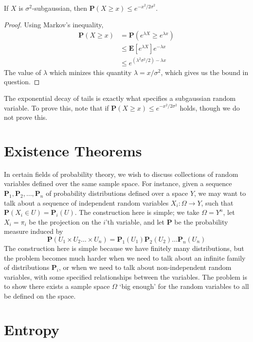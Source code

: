 \begin{theorem}
    If $X$ is $\sigma^2$-subgaussian, then $\mathbf{P}(X \geq x) \leq e^{-x^2/2\sigma^2}$.
\end{theorem}
\begin{proof}
    Using Markov's inequality,
    \begin{align*}
        \mathbf{P}(X \geq x) &= \mathbf{P}(e^{\lambda X} \geq e^{\lambda x})\\
        &\leq \mathbf{E}[e^{\lambda X}] e^{- \lambda x}\\
        &\leq e^{(\lambda^2 \sigma^2/2) - \lambda x}
    \end{align*}
    The value of $\lambda$ which minizes this quantity $\lambda = x/\sigma^2$, which gives us the bound in question.
\end{proof}

The exponential decay of tails is exactly what specifies a subgaussian random variable. To prove this, note that if $\mathbf{P}(X \geq x) \leq e^{-x^2/2\sigma^2}$ holds, though we do not prove this.

\chapter{Existence Theorems}

In certain fields of probability theory, we wish to discuss collections of random variables defined over the same sample space. For instance, given a sequence $\mathbf{P}_1, \mathbf{P}_2, \dots, \mathbf{P}_n$ of probability distributions defined over a space $Y$, we may want to talk about a sequence of independent random variables $X_i: \Omega \to Y$, such that $\mathbf{P}(X_i \in U) = \mathbf{P}_i(U)$. The construction here is simple; we take $\Omega = Y^n$, let $X_i = \pi_i$ be the projection on the $i$'th variable, and let $\mathbf{P}$ be the probability measure induced by
%
\[ \mathbf{P}(U_1 \times U_2 \dots \times U_n) = \mathbf{P}_1(U_1) \mathbf{P}_2(U_2) \dots \mathbf{P}_n(U_n) \]
%
The construction here is simple because we have finitely many distributions, but the problem becomes much harder when we need to talk about an infinite family of distributions $\mathbf{P}_i$, or when we need to talk about non-independent random variables, with some specified relationships between the variables. The problem is to show there exists a sample space $\Omega$ `big enough' for the random variables to all be defined on the space.

\chapter{Entropy}

